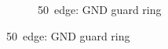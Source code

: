 \begin{figure}[htbp]
\begin{subfigure}[b]{0.33\textwidth}
    \caption{50~\micron edge: GND guard ring}
    \label{fig:GuardRingLayout_50_GND_GR}
  \end{subfigure}
  \label{fig:GuardRingLayout}
\end{figure}